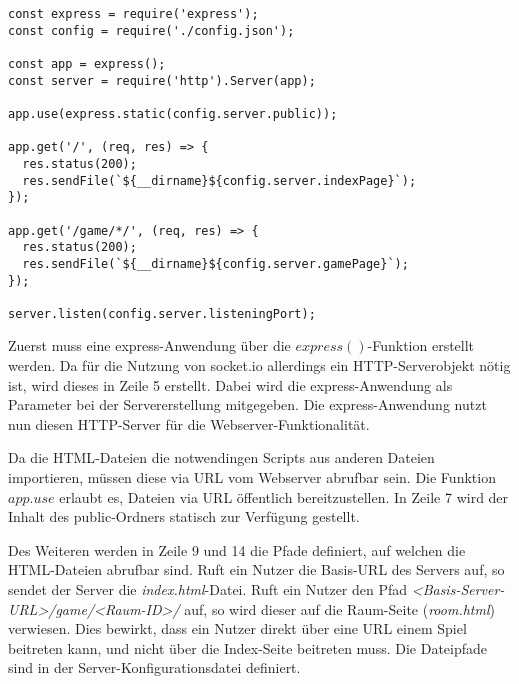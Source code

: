 \vspace{11pt}
\lstset{language=js, style=STYLE_CODE_JS}
\begin{minipage}{\textwidth}
\begin{singlespace}
\begin{lstlisting}[caption={express Server -- Server.js}, captionpos=b, label={lst:express}]
const express = require('express');
const config = require('./config.json');

const app = express();
const server = require('http').Server(app);

app.use(express.static(config.server.public));

app.get('/', (req, res) => {
  res.status(200);
  res.sendFile(`${__dirname}${config.server.indexPage}`);
});

app.get('/game/*/', (req, res) => {
  res.status(200);
  res.sendFile(`${__dirname}${config.server.gamePage}`);
});

server.listen(config.server.listeningPort);
\end{lstlisting}
\end{singlespace}
\end{minipage}

Zuerst muss eine express-Anwendung über die $express()$-Funktion erstellt werden. Da für die Nutzung von socket.io allerdings ein \acs{HTTP}-Serverobjekt nötig ist, wird dieses in Zeile 5 erstellt. Dabei wird die express-Anwendung als Parameter bei der Servererstellung mitgegeben. Die express-Anwendung nutzt nun diesen \acs{HTTP}-Server für die Webserver-Funktionalität.\par

Da die \acs{HTML}-Dateien die notwendingen Scripts aus anderen Dateien importieren, müssen diese via \acs{URL} vom Webserver abrufbar sein. Die Funktion $app.use$ erlaubt es, Dateien via \acs{URL} öffentlich bereitzustellen. In Zeile 7 wird der Inhalt des \glqq{}public\grqq{}-Ordners statisch zur Verfügung gestellt.\par

Des Weiteren werden in Zeile 9 und 14 die Pfade definiert, auf welchen die \acs{HTML}-Dateien abrufbar sind. Ruft ein Nutzer die Basis-\acs{URL} des Servers auf, so sendet der Server die \textit{index.html}-Datei. Ruft ein Nutzer den Pfad \textit{<Basis-Server-URL>/game/<Raum-ID>/} auf, so wird dieser auf die Raum-Seite (\textit{room.html}) verwiesen. Dies bewirkt, dass ein Nutzer direkt über eine \acs{URL} einem Spiel beitreten kann, und nicht über die Index-Seite beitreten muss. Die Dateipfade sind in der Server-Konfigurationsdatei definiert.

